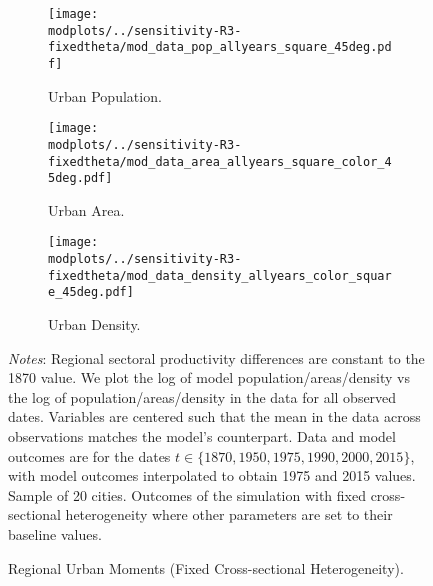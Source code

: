 \documentclass[./20250130-paper.tex]{subfiles}
\begin{document}
\begin{figure}[p!]
	\begin{adjustbox}{center}
		\begin{subfigure}{\pthree\textwidth}
			\texttt{[image: \\modplots/../sensitivity-R3-fixedtheta/mod\_data\_pop\_allyears\_square\_45deg.pdf]}
			\caption{Urban Population.\label{fig:model-data-Lu-fixedcross}}
		\end{subfigure}
		\begin{subfigure}{\pthree\textwidth}
			\texttt{[image: \\modplots/../sensitivity-R3-fixedtheta/mod\_data\_area\_allyears\_square\_color\_45deg.pdf]}
			\caption{Urban Area.\label{fig:model-data-area-fixedcross}}
		\end{subfigure}
		\begin{subfigure}{\pthree\textwidth}
			\texttt{[image: \\modplots/../sensitivity-R3-fixedtheta/mod\_data\_density\_allyears\_color\_square\_45deg.pdf]}
			\caption{Urban Density.\label{fig:model-data-density-fixedcross}}
		\end{subfigure}
	\end{adjustbox}
	\caption{Regional Urban Moments (Fixed Cross-sectional Heterogeneity).\label{fig:model-data-fixedcross}}
	
	{\footnotesize \textit{Notes}: Regional sectoral productivity differences  are constant to the 1870 value. We plot the log of model population/areas/density vs the log of population/areas/density in the data for all observed dates. Variables are centered such that the mean in the data across observations matches the model's counterpart. Data and model outcomes are for the dates $t \in \{1870, 1950, 1975, 1990, 2000, 2015 \}$, with model outcomes interpolated to obtain 1975 and 2015 values. Sample of 20 cities. Outcomes of the simulation with fixed cross-sectional heterogeneity where other parameters are set to their baseline values.}
\end{figure}
\end{document}
